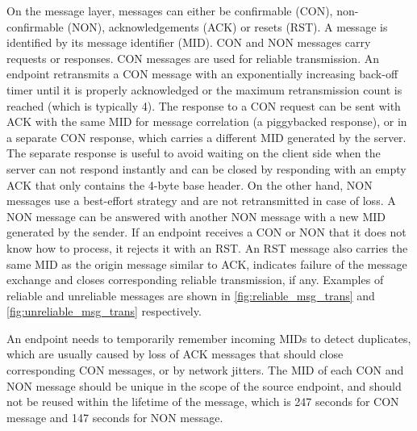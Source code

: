 On the message layer, messages can either be confirmable (CON), non-confirmable (NON), acknowledgements (ACK) or resets (RST). A message is identified by its message identifier (MID). CON and NON messages carry requests or responses. CON messages are used for reliable transmission. An endpoint retransmits a CON message with an exponentially increasing back-off timer until it is properly acknowledged or the maximum retransmission count is reached (which is typically 4). The response to a CON request can be sent with ACK with the same MID for message correlation (a piggybacked response), or in a separate CON response, which carries a different MID generated by the server. The separate response is useful to avoid waiting on the client side when the server can not respond instantly and can be closed by responding with an empty ACK that only contains the 4-byte base header. On the other hand, NON messages use a best-effort strategy and are not retransmitted in case of loss. A NON message can be answered with another NON message with a new MID generated by the sender. If an endpoint receives a CON or NON that it does not know how to process, it rejects it with an RST. An RST message also carries the same MID as the origin message similar to ACK, indicates failure of the message exchange and closes corresponding reliable transmission, if any. Examples of reliable and unreliable messages are shown in \autoref{fig:reliable_msg_trans} and \autoref{fig:unreliable_msg_trans} respectively.

An endpoint needs to temporarily remember incoming MIDs to detect duplicates, which are usually caused by loss of ACK messages that should close corresponding CON messages, or by network jitters. The MID of each CON and NON message should be unique in the scope of the source endpoint, and should not be reused within the lifetime of the message, which is 247 seconds for CON message and 147 seconds for NON message.  




